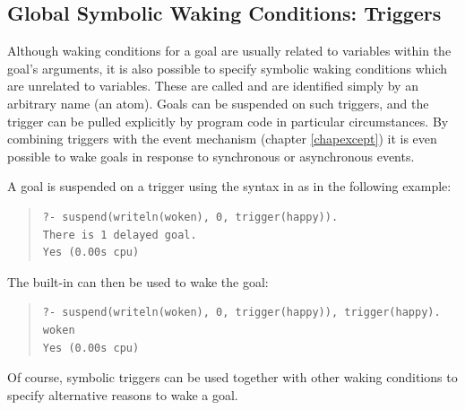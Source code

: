 {%
\subsection{Global Symbolic Waking Conditions: Triggers}
\label{trigger}

Although waking conditions for a goal are usually related to variables
within the goal's arguments, it is also possible to specify symbolic
waking conditions which are unrelated to variables.
%
These are called  and are identified simply by an
arbitrary name (an atom). Goals can be suspended on such triggers,
and the trigger can be pulled explicitly by program code in
particular circumstances. By combining triggers with the event mechanism
(chapter \ref{chapexcept}) it is even possible to wake goals in
response to synchronous or asynchronous events.

A goal is suspended on a trigger using the syntax 
in 
as in the following example:
\begin{quote}
\begin{verbatim}
?- suspend(writeln(woken), 0, trigger(happy)).
There is 1 delayed goal.
Yes (0.00s cpu)
\end{verbatim}
\end{quote}
The built-in
can then be used to wake the goal:
\begin{quote}
\begin{verbatim}
?- suspend(writeln(woken), 0, trigger(happy)), trigger(happy).
woken
Yes (0.00s cpu)
\end{verbatim}
\end{quote}
Of course, symbolic triggers can be used together with other
waking conditions to specify alternative reasons to wake a goal.



}
